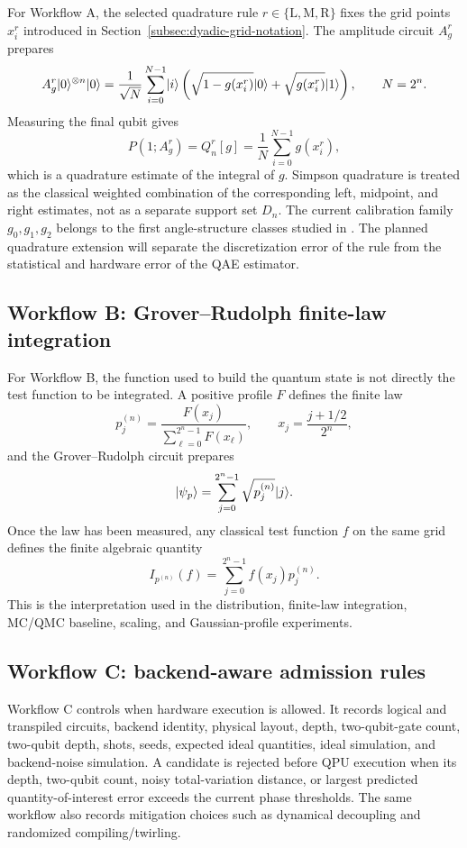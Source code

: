 For Workflow A, the selected quadrature rule \(r\in\{\mathrm{L},\mathrm{M},\mathrm{R}\}\)
fixes the grid points \(x_i^{r}\) introduced in
Section~\ref{subsec:dyadic-grid-notation}. The amplitude circuit \(A_g^{r}\)
prepares
\[
  A_g^{r}\lvert 0\rangle^{\otimes n}\lvert 0\rangle
  =
  \frac{1}{\sqrt{N}}\sum_{i=0}^{N-1}
  \lvert i\rangle
  \left(
    \sqrt{1-g(x_i^{r})}\lvert 0\rangle
    +
    \sqrt{g(x_i^{r})}\lvert 1\rangle
  \right),
  \qquad N=2^n.
\]
Measuring the final qubit gives
\[
  P(1;A_g^{r})
  =
  Q_n^{r}[g]
  =
  \frac{1}{N}\sum_{i=0}^{N-1} g(x_i^{r}),
\]
which is a quadrature estimate of the integral of \(g\). Simpson quadrature is
treated as the classical weighted combination of the corresponding left,
midpoint, and right estimates, not as a separate support set \(D_n\). The
current calibration family \(g_0,g_1,g_2\) belongs to the first
angle-structure classes studied in \cite{chinesta2026encoding}. The planned
quadrature extension will separate the discretization error of the rule from
the statistical and hardware error of the QAE estimator.

\subsection{Workflow B: Grover--Rudolph finite-law integration}
\label{subsec:workflow-b}

For Workflow B, the function used to build the quantum state is not directly
the test function to be integrated. A positive profile \(F\) defines the finite
law
\[
  p^{(n)}_j
  =
  \frac{F(x_j)}{\sum_{\ell=0}^{2^n-1}F(x_\ell)},
  \qquad
  x_j=\frac{j+1/2}{2^n},
\]
and the Grover--Rudolph circuit prepares
\[
  \lvert \psi_p\rangle=\sum_{j=0}^{2^n-1}\sqrt{p^{(n)}_j}\lvert j\rangle.
\]
Once the law has been measured, any classical test function \(f\) on the same
grid defines the finite algebraic quantity
\[
  I_{p^{(n)}}(f)=\sum_{j=0}^{2^n-1}f(x_j)p^{(n)}_j.
\]
This is the interpretation used in the distribution, finite-law integration,
MC/QMC baseline, scaling, and Gaussian-profile experiments.

\subsection{Workflow C: backend-aware admission rules}
\label{subsec:workflow-c}

Workflow C controls when hardware execution is allowed. It records logical and
transpiled circuits, backend identity, physical layout, depth, two-qubit-gate
count, two-qubit depth, shots, seeds, expected ideal quantities, ideal
simulation, and backend-noise simulation. A candidate is rejected before QPU
execution when its depth, two-qubit count, noisy total-variation distance, or
largest predicted quantity-of-interest error exceeds the current phase
thresholds. The same workflow also records mitigation choices such as
dynamical decoupling and randomized compiling/twirling.

